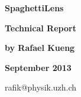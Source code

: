 \begin{center}


\vspace{2cm}


{\Huge\bf SpaghettiLens}

\vspace{.5cm}

{\Huge\bf Technical Report}

\vspace{2.5cm}

{\Large\bf by Rafael Kueng}%
\vspace{2cm}

{\Large\bf September 2013} %

\vspace{\fill}

rafik@physik.uzh.ch

\end{center}
\newpage
